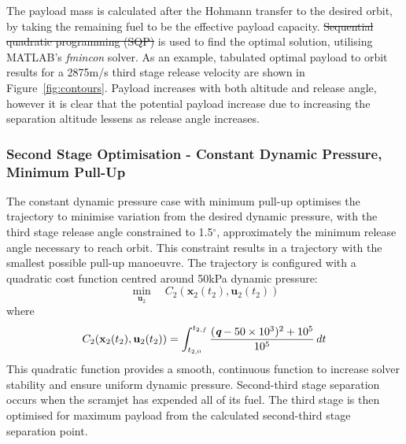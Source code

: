 \documentclass[journal]{new-aiaa}
\providecommand{\DIFadd}[1]{{\protect\color{blue}\uwave{#1}}} %
\providecommand{\DIFdel}[1]{{\protect\color{red}\sout{#1}}}                      %
\providecommand{\DIFaddbegin}{} %
\providecommand{\DIFaddend}{} %
\providecommand{\DIFdelbegin}{} %
\providecommand{\DIFdelend}{} %
\newcommand{\DIFscaledelfig}{0.5}
\newlength{\DIFdelgraphicswidth} %
\newlength{\DIFdelgraphicsheight} %
\newcommand{\DIFaddincludegraphics}[2][]{{\color{blue}\fbox{\DIFOincludegraphics[#1]{#2}}}} %
\newcommand{\DIFdelincludegraphics}[2][]{%
\sbox{\DIFdelgraphicsbox}{\DIFOincludegraphics[#1]{#2}}%
\settoboxwidth{\DIFdelgraphicswidth}{\DIFdelgraphicsbox} %
\settoboxtotalheight{\DIFdelgraphicsheight}{\DIFdelgraphicsbox} %
\scalebox{\DIFscaledelfig}{%
\parbox[b]{\DIFdelgraphicswidth}{\usebox{\DIFdelgraphicsbox}\\[-\baselineskip] \rule{\DIFdelgraphicswidth}{0em}}\llap{\resizebox{\DIFdelgraphicswidth}{\DIFdelgraphicsheight}{%
\setlength{\unitlength}{\DIFdelgraphicswidth}%
\begin{picture}(1,1)%
\thicklines\linethickness{2pt} %
{\color[rgb]{1,0,0}\put(0,0){\framebox(1,1){}}}%
{\color[rgb]{1,0,0}\put(0,0){\line( 1,1){1}}}%
{\color[rgb]{1,0,0}\put(0,1){\line(1,-1){1}}}%
\end{picture}%
}\hspace*{3pt}}} %
} %
\DeclareRobustCommand{\DIFaddbegin}{\DIFOaddbegin \let\includegraphics\DIFaddincludegraphics} %
\DeclareRobustCommand{\DIFaddend}{\DIFOaddend \let\includegraphics\DIFOincludegraphics} %
\DeclareRobustCommand{\DIFdelbegin}{\DIFOdelbegin \let\includegraphics\DIFdelincludegraphics} %
\DeclareRobustCommand{\DIFdelend}{\DIFOaddend \let\includegraphics\DIFOincludegraphics} %
\begin{document}
	  
	  
	  The payload mass is calculated after the Hohmann transfer to the desired orbit, by taking the remaining fuel to be the effective payload capacity. \DIFdelbegin \DIFdel{Sequential quadratic programming (SQP) }\DIFdelend \DIFaddbegin \DIFadd{\textcolor{red}{SQP} }\DIFaddend is used to find the optimal solution, utilising MATLAB's \textit{fmincon} solver\DIFaddbegin \DIFadd{\mbox{%
\cite{MATLAB}}%
}\DIFaddend .
	    As an example, tabulated optimal payload to orbit results for a 2875m/s third stage release velocity are shown in Figure~\ref{fig:contours}. Payload increases with both altitude and release angle, however it is clear that the potential payload increase due to increasing the separation altitude lessens as release angle increases.  

	
	 
	 	 \subsubsection{Second Stage Optimisation - Constant Dynamic Pressure, Minimum Pull-Up}

	 	 
	 	 The constant dynamic pressure case with minimum pull-up optimises the trajectory to minimise variation from the desired dynamic pressure, with the third stage release angle constrained to 1.5$^\circ$, approximately the minimum release angle necessary to reach orbit. This constraint results in a trajectory with the smallest possible pull-up manoeuvre. 
	 	 The trajectory is configured with a quadratic cost function centred around 50kPa dynamic pressure:
	 	 \begin{equation} 
	 	 \min\limits_{\textbf{u}_2} \quad C_2(\textbf{x}_{2}(t_2),\textbf{u}_{2}(t_2))
	 	 \end{equation}
	 	 where
	 	 \begin{equation}
	 	 C_2(\textbf{x}_{2}(t_2),\textbf{u}_{2}(t_2)) = \int_{t_{2,0}}^{t_{2,f}} \frac{(\textit{\textbf{q}}-50\times 10^3)^2+10^5}{10^5} \, dt
	 	 \end{equation}
	This quadratic function provides a smooth, continuous function to increase solver stability and ensure uniform dynamic pressure. \DIFaddbegin \DIFadd{\textcolor{red}{Scaling and translating constants of $10^5$ are included to normalize the cost function, in order to improve the accuracy and stability of the solution}. }\DIFaddend Second-third stage separation occurs when the scramjet has expended all of its fuel.  The third stage is then optimised for maximum payload from the calculated second-third stage separation point. 
\end{document}
